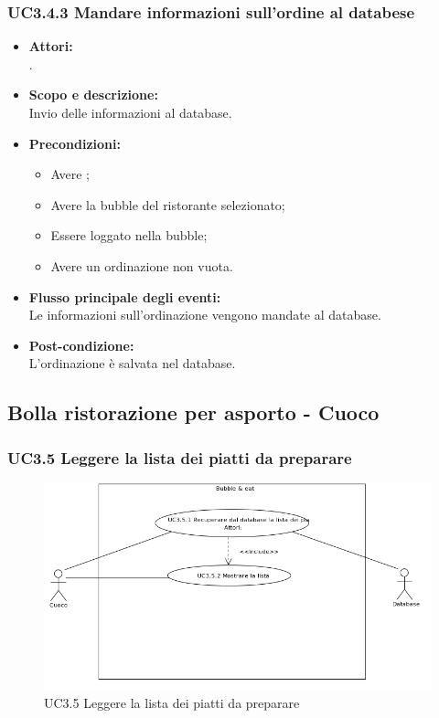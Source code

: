 \subsubsection{UC3.4.3 Mandare informazioni sull’ordine al databese} \label{UC3.4.3}

\begin{itemize}
	\item \textbf{Attori:}
	\\.
	\item \textbf{Scopo e descrizione:} 
	\\Invio delle informazioni al database.
	\item \textbf{Precondizioni:}
	\begin{itemize}
		\item Avere ;
		\item Avere la bubble del ristorante selezionato;
		\item Essere loggato nella bubble;
		\item Avere un ordinazione non vuota.
	\end{itemize}
	\item \textbf{Flusso principale degli eventi:}
	\\Le informazioni sull’ordinazione vengono mandate al database.
	\item \textbf{Post-condizione:}
	\\L’ordinazione è salvata nel database.
\end{itemize}

\subsection{Bolla ristorazione per asporto - Cuoco}

\subsubsection{UC3.5 Leggere la lista dei piatti da preparare} \label{UC3.5}

\begin{figure}[H]
	\centering
	\includegraphics[width=15cm]{../../documenti/AnalisiDeiRequisiti/Diagrammi_img/uc3_5.png}
	\caption{UC3.5 Leggere la lista dei piatti da preparare}
\end{figure}

